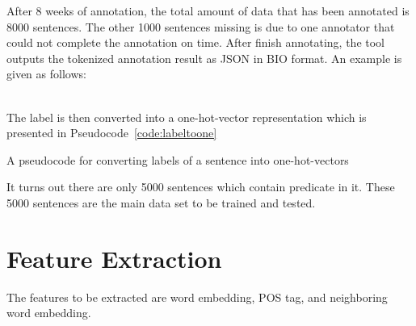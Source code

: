 After 8 weeks of annotation, the total amount of data that has been annotated is 8000 sentences. The other 1000 sentences missing is due to one annotator that could not complete the annotation on time. After finish annotating, the tool outputs the tokenized annotation result as JSON in BIO format. An example is given as follows:

\\

The label is then converted into a one-hot-vector representation which is presented in Pseudocode~\ref{code:labeltoone}
\begin{kode}
	
	
	\caption{A pseudocode for converting labels of a sentence into one-hot-vectors}
	\label{code:labeltoone}
	
\end{kode}

It turns out there are only 5000 sentences which contain predicate in it. These 5000 sentences are the main data set to be trained and tested.

\section{Feature Extraction}
The features to be extracted are word embedding, POS tag, and neighboring word embedding.

